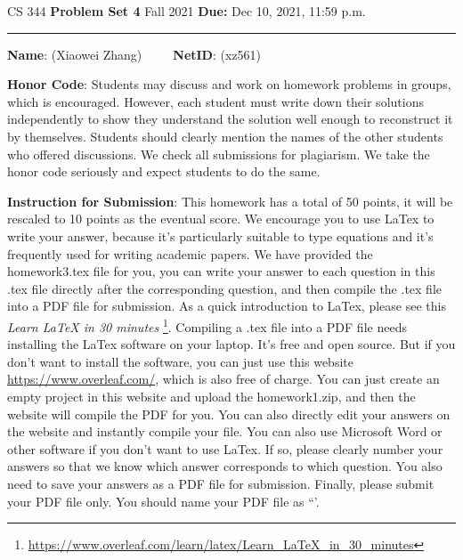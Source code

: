 \documentclass[12pt]{article}
\begin{document}
\noindent
CS 344 \hfill \textbf{Problem Set 4} \newline 
{Fall 2021} \hfill \textbf{Due:} Dec 10, 2021, 11:59 p.m.

\noindent
\rule{\linewidth}{0.4pt}
\vspace{.4cm}

\textbf{Name}: ({\color{blue}Xiaowei Zhang})~~~~~\textbf{NetID}: ({\color{blue}xz561})

\vspace{.5cm}

\textbf{Honor Code}: Students may discuss and work on homework problems in groups, which is encouraged. However, each student must write down their solutions independently to show they understand the solution well enough to reconstruct it by themselves.  Students should clearly mention the names of the other students who offered discussions. We check all submissions for plagiarism. We take the honor code seriously and expect students to do the same.


\vspace{.5cm}

\textbf{Instruction for Submission}: This homework has a total of 50 points, it will be rescaled to 10 points as the eventual score. We encourage you to use LaTex to write your answer, because it's particularly suitable to type equations and it's frequently used for writing academic papers. We have provided the homework3.tex file for you, you can write your answer to each question in this .tex file directly after the corresponding question, and then compile the .tex file into a PDF file for submission. As a quick introduction to LaTex, please see this \textit{Learn LaTeX in 30 minutes} \footnote{\url{https://www.overleaf.com/learn/latex/Learn_LaTeX_in_30_minutes}}. Compiling a .tex file into a PDF file needs installing the LaTex software on your laptop. It's free and open source. But if you don't want to install the software, you can just use this website \url{https://www.overleaf.com/}, which is also free of charge. You can just create an empty project in this website and upload the homework1.zip, and then the website will compile the PDF for you. You can also directly edit your answers on the website and instantly compile your file. You can also use Microsoft Word or other software if you don't want to use LaTex. If so, please clearly number your answers so that we know which answer corresponds to which question. You also need to save your answers as a PDF file for submission. Finally, please submit your PDF file only. You should name your PDF file as ``{\color{blue}{Firstname-Lastname-NetID.pdf'}}'.
\end{document}

